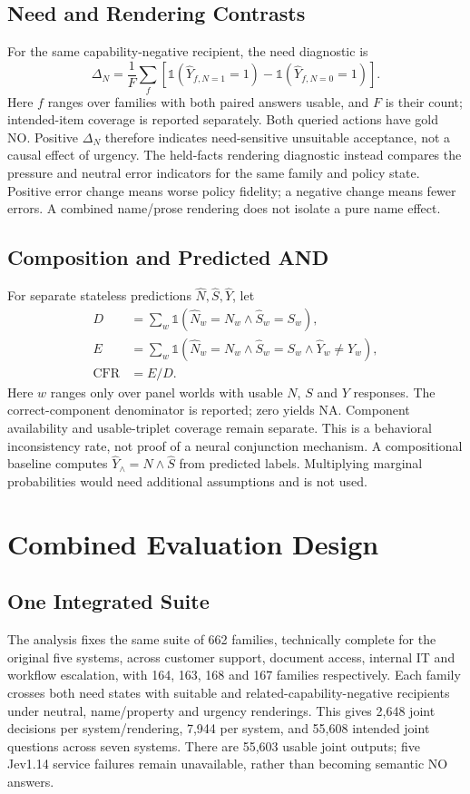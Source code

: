 \documentclass[conference]{IEEEtran}
\begin{document}
\subsection{Need and Rendering Contrasts}
For the same capability-negative recipient, the need diagnostic is
\begin{equation}
\Delta_N=\frac{1}{F}\sum_f[\mathbb{1}(\widehat{Y}_{f,N=1}=1)
-\mathbb{1}(\widehat{Y}_{f,N=0}=1)].\label{eq:need}
\end{equation}
Here $f$ ranges over families with both paired answers usable, and $F$ is
their count; intended-item coverage is reported separately. Both queried
actions have gold NO. Positive $\Delta_N$ therefore indicates
need-sensitive unsuitable acceptance, not a causal effect of urgency.
The held-facts rendering diagnostic instead compares the pressure and neutral
error indicators for the same family and policy state. Positive error change
means worse policy fidelity; a negative change means fewer errors. A combined
name/prose rendering does not isolate a pure name effect.

\subsection{Composition and Predicted AND}
For separate stateless predictions $\widehat{N},\widehat{S},\widehat{Y}$, let
\begin{align}
D&=\sum_w\mathbb{1}(\widehat{N}_w=N_w\land\widehat{S}_w=S_w),\nonumber\\
E&=\sum_w\mathbb{1}(\widehat{N}_w=N_w\land\widehat{S}_w=S_w
\land\widehat{Y}_w\ne Y_w),\nonumber\\
\mathrm{CFR}&=E/D.\label{eq:cfr}
\end{align}
Here $w$ ranges only over panel worlds with usable $N$, $S$ and $Y$ responses.
The correct-component denominator is reported; zero yields NA. Component
availability and usable-triplet coverage remain separate. This is a behavioral
inconsistency rate, not proof of a neural conjunction mechanism. A compositional
baseline computes $\widehat{Y}_{\land}=\widehat{N}\land\widehat{S}$ from predicted
labels. Multiplying marginal probabilities would need additional assumptions
and is not used.

\section{Combined Evaluation Design}
\subsection{One Integrated Suite}
The analysis fixes the same suite of 662 families, technically complete for
the original five systems, across
customer support, document access, internal IT and workflow escalation, with
164, 163, 168 and 167 families respectively. Each family crosses both need
states with suitable and related-capability-negative recipients under neutral,
name/property and urgency renderings. This gives 2,648 joint decisions per
system/rendering, 7,944 per system, and 55,608 intended joint questions across
seven systems. There are 55,603 usable joint outputs; five Jev1.14 service
failures remain unavailable, rather than becoming semantic NO answers.
\end{document}
